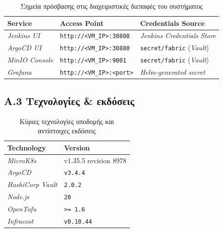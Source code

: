 \begin{table}[htbp]
\centering
\renewcommand{\arraystretch}{1.5}
\caption{Σημεία πρόσβασης στις διαχειριστικές διεπαφές του συστήματος}
\label{tab:access}
\small
\begin{tabularx}{\textwidth}{| >{\centering\arraybackslash}p{3cm} | >{\centering\arraybackslash}p{5cm} | X |}
\hline
\rowcolor{HUAblue} 
\textbf{\color{white} Service} & \textbf{\color{white} Access Point} & \textbf{\color{white} Credentials Source} \\ \hline

\textit{Jenkins UI} & \texttt{http://<VM\_IP>:30808} & \textit{Jenkins Credentials Store} \\ \hline

\rowcolor{lightgray!30}
\textit{ArgoCD UI} & \texttt{http://<VM\_IP>:30880} & \texttt{secret/fabric} (\textit{Vault}) \\ \hline

\textit{MinIO Console} & \texttt{http://<VM\_IP>:9001} & \texttt{secret/fabric} (\textit{Vault}) \\ \hline

\rowcolor{lightgray!30}
\textit{Grafana} & \texttt{http://<VM\_IP>:<port>} & \textit{Helm-generated secret} \\ \hline
\end{tabularx}
\end{table}

\newpage

\subsection*{Α.3 Τεχνολογίες \& εκδόσεις}

\begin{table}[htbp]
\centering
\renewcommand{\arraystretch}{1.5}
\caption{Κύριες τεχνολογίες υποδομής και αντίστοιχες εκδόσεις}
\label{tab:versions}
\small
\begin{tabularx}{\textwidth}{| >{\centering\arraybackslash}p{4cm} | X |}
\hline
\rowcolor{HUAblue} 
\textbf{\color{white} Technology} & \textbf{\color{white} Version} \\ \hline

\textit{MicroK8s} & v1.35.5 revision 8978 \\ \hline

\rowcolor{lightgray!30}
\textit{ArgoCD} & \texttt{v3.4.4} \\ \hline

\textit{HashiCorp Vault} & \texttt{2.0.2} \\ \hline

\rowcolor{lightgray!30}
\textit{Node.js} & \texttt{20} \\ \hline

\textit{OpenTofu} & \texttt{\textgreater= 1.6} \\ \hline

\rowcolor{lightgray!30}
\textit{Infracost} & \texttt{v0.10.44} \\ \hline
\end{tabularx}
\end{table}

